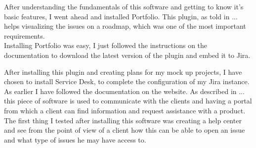 	
	After understanding the fundamentals of this software and getting to know it's basic features, I went ahead and installed Portfolio.
	This plugin, as told in ... helps visualizing the issues on a roadmap, which was one of the most important requirements.\\
	Installing Portfolio was easy, I just followed the instructions on the documentation to download the latest version of the plugin and embed it to Jira.
	
	
	After installing this plugin and creating plans for my mock up projects, I have chosen to install Service Desk, to complete the configuration of my Jira instance.
	As earlier I have followed the documentation on the website.
	As described in ... this piece of software is used to communicate with the clients and having a portal from which a client can find information and request assistance with a product.
	The first thing I tested after installing this software was creating a help center and see from the point of view of a client how this can be able to open an issue and what type of issues he may have access to.
	
	
